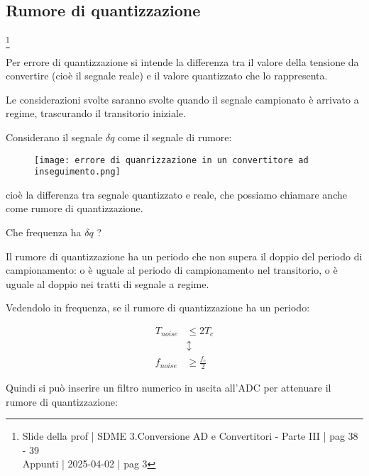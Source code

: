 \newpage 

\subsection{Rumore di quantizzazione}
\footnote{Slide della prof | SDME 3.Conversione AD e Convertitori - Parte III | pag 38 - 39 \\  
Appunti | 2025-04-02 | pag 3 }

Per errore di quantizzazione si intende la differenza tra il valore della tensione da convertire (cioè il segnale reale) 
e il valore quantizzato che lo rappresenta. \newline 

Le considerazioni svolte saranno svolte quando il segnale campionato è arrivato a regime, trascurando il transitorio iniziale. \newline 

Considerano il segnale $\delta q$ come il segnale di rumore: 

\begin{figure}[h]
    \centering
    \texttt{[image: errore di quanrizzazione in un convertitore ad inseguimento.png]}
\end{figure}

cioè la differenza tra segnale quantizzato e reale, che possiamo chiamare anche come rumore di quantizzazione. \newline  

Che frequenza ha $\delta q$ ? \newline 

Il rumore di quantizzazione ha un periodo che non supera il doppio del periodo di campionamento: 
o è uguale al periodo di campionamento nel transitorio, o è uguale al doppio nei tratti di segnale a regime. \newline 

Vedendolo in frequenza, se il rumore di quantizzazione ha un periodo: 

{
        \Large 
        \begin{equation}
            \begin{split}
            T_{noise} &\leq 2 T_c 
            \\
            &\updownarrow 
            \\
            f_{noise} &\ge \frac{f_c}{2}
            \end{split}
        \end{equation}
}

Quindi si può inserire un filtro numerico in uscita all'ADC per attenuare il rumore di quantizzazione: 

